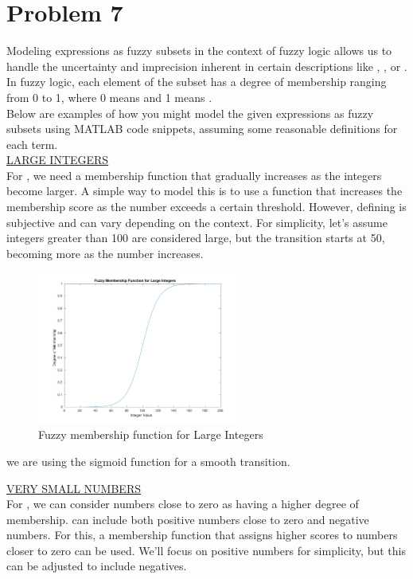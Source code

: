 \section{Problem 7}
Modeling expressions as fuzzy subsets in the context of fuzzy logic allows us to handle the uncertainty and imprecision inherent in certain descriptions like , , or . In fuzzy logic, each element of the subset has a degree of membership ranging from 0 to 1, where 0 means  and 1 means .\\
Below are examples of how you might model the given expressions as fuzzy subsets using MATLAB code snippets, assuming some reasonable definitions for each term.\\

\underline{LARGE INTEGERS}\\
For , we need a membership function that gradually increases as the integers become larger. A simple way to model this is to use a function that increases the membership score as the number exceeds a certain threshold. However, defining  is subjective and can vary depending on the context. For simplicity, let's assume integers greater than 100 are considered large, but the transition starts at 50, becoming more  as the number increases.

\begin{figure}[H]
	\centering
	\includegraphics[width=0.6\textwidth]{../Problem 7/large_int.pdf}
	\caption{Fuzzy membership function for Large Integers}	
\end{figure}
we are using the sigmoid function for a smooth transition.
\vspace{5mm}

\underline{VERY SMALL NUMBERS}\\
For , we can consider numbers close to zero as having a higher degree of membership.  can include both positive numbers close to zero and negative numbers. For this, a membership function that assigns higher scores to numbers closer to zero can be used. We'll focus on positive numbers for simplicity, but this can be adjusted to include negatives.

